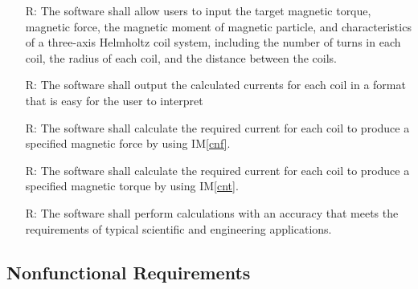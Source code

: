 \documentclass[12pt]{article}
\newcommand{\iref}[1]{IM\ref{#1}}
\newcounter{reqnum} %
\begin{document}
\noindent \begin{itemize}

\item[R\refstepcounter{reqnum}\thereqnum \label{R_Inputs}:] {The software shall allow users to input the target magnetic torque, magnetic force, the magnetic moment of magnetic particle, and characteristics of a three-axis Helmholtz coil system, including the number of turns in each coil, the radius of each coil, and the distance between the coils.}

\item[R\refstepcounter{reqnum}\thereqnum \label{R_OutputInputs}:] {The software shall output the calculated currents for each coil in a format that is easy for the user to interpret}

\item[R\refstepcounter{reqnum}\thereqnum \label{R_Calculate1}:] {The software shall calculate the required current for each coil to produce a specified magnetic force by using \iref{cnf}.}

\item[R\refstepcounter{reqnum}\thereqnum \label{R_Calculate2}:] {The software shall calculate the required current for each coil to produce a specified magnetic torque by using \iref{cnt}.}

\item[R\refstepcounter{reqnum}\thereqnum \label{R_Output}:] {The software shall perform calculations with an accuracy that meets the requirements of typical scientific and engineering applications.}

\end{itemize}

\subsection{Nonfunctional Requirements}
\end{document}
